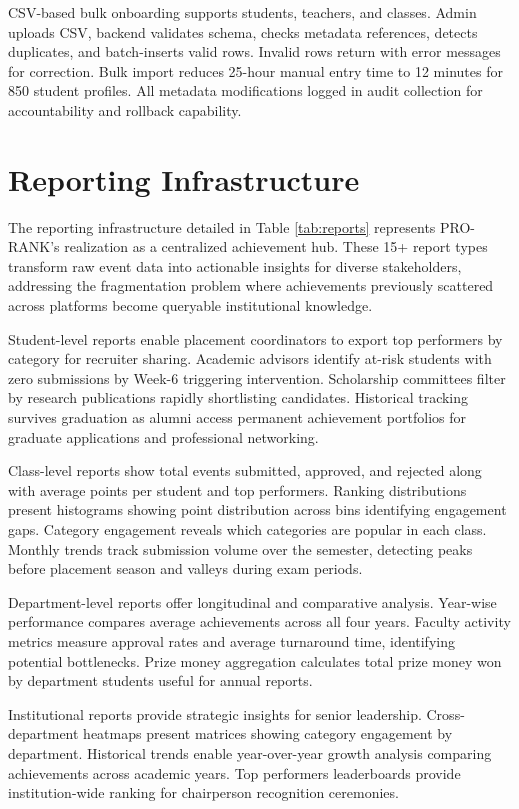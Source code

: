 \documentclass[12pt]{article}
\begin{document}
CSV-based bulk onboarding supports students, teachers, and classes. Admin uploads CSV, backend validates schema, checks metadata references, detects duplicates, and batch-inserts valid rows. Invalid rows return with error messages for correction. Bulk import reduces 25-hour manual entry time to 12 minutes for 850 student profiles. All metadata modifications logged in audit collection for accountability and rollback capability.

\section{Reporting Infrastructure}

The reporting infrastructure detailed in Table \ref{tab:reports} represents PRO-RANK's realization as a centralized achievement hub. These 15+ report types transform raw event data into actionable insights for diverse stakeholders, addressing the fragmentation problem where achievements previously scattered across platforms become queryable institutional knowledge.

Student-level reports enable placement coordinators to export top performers by category for recruiter sharing. Academic advisors identify at-risk students with zero submissions by Week-6 triggering intervention. Scholarship committees filter by research publications rapidly shortlisting candidates. Historical tracking survives graduation as alumni access permanent achievement portfolios for graduate applications and professional networking.

Class-level reports show total events submitted, approved, and rejected along with average points per student and top performers. Ranking distributions present histograms showing point distribution across bins identifying engagement gaps. Category engagement reveals which categories are popular in each class. Monthly trends track submission volume over the semester, detecting peaks before placement season and valleys during exam periods.

Department-level reports offer longitudinal and comparative analysis. Year-wise performance compares average achievements across all four years. Faculty activity metrics measure approval rates and average turnaround time, identifying potential bottlenecks. Prize money aggregation calculates total prize money won by department students useful for annual reports.

Institutional reports provide strategic insights for senior leadership. Cross-department heatmaps present matrices showing category engagement by department. Historical trends enable year-over-year growth analysis comparing achievements across academic years. Top performers leaderboards provide institution-wide ranking for chairperson recognition ceremonies.
\end{document}
